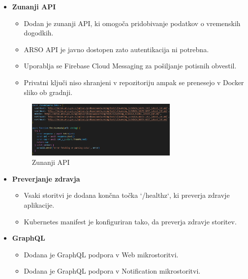 \documentclass[a4paper,11pt]{article}
\begin{document}
\begin{itemize}
	\item \textbf{Zunanji API}
	      \begin{itemize}
	      	\item Dodan je zunanji API, ki omogoča pridobivanje podatkov o vremenskih dogodkih.
	      	\item ARSO API je javno dostopen zato autentikacija ni potrebna.
	      	\item Uporablja se Firebase Cloud Messaging za pošiljanje potisnih obvestil.
	      	\item Privatni ključi niso shranjeni v repozitoriju ampak se prenesejo v Docker sliko ob gradnji.
	      \end{itemize}
	      
	      \begin{figure}[h!]
	      	\centering
	      	\includegraphics[width=0.7\textwidth]{images/arsoapi.png}
	      	\caption{Zunanji API}
	      	\label{fig:api}
	      \end{figure}
	      
	\item \textbf{Preverjanje zdravja}
	      \begin{itemize}
	      	\item Vsaki storitvi je dodana končna točka `/healthz`, ki preverja zdravje aplikacije.
	      	\item Kubernetes manifest je konfiguriran tako, da preverja zdravje storitev.
	      \end{itemize}
	\item \textbf{GraphQL}
	      \begin{itemize}
	      	\item Dodana je GraphQL podpora v Web mikrostoritvi.
	      	\item Dodana je GraphQL podpora v Notification mikrostoritvi.
	      \end{itemize}
	      

\end{itemize}
\end{document}
